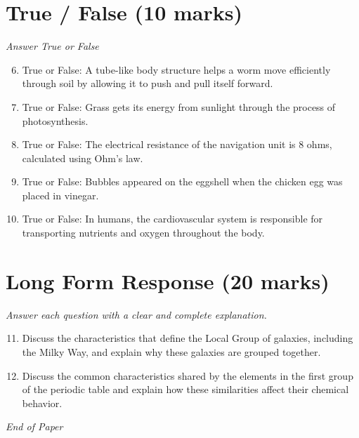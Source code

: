 \documentclass[12pt]{article}
\begin{document}
\section*{True / False (10 marks)}
\textit{Answer True or False}
\begin{enumerate}[label=\arabic*.]
\setcounter{enumi}{5}
\item True or False: A tube-like body structure helps a worm move efficiently through soil by allowing it to push and pull itself forward.
\item True or False: Grass gets its energy from sunlight through the process of photosynthesis.
\item True or False: The electrical resistance of the navigation unit is 8 ohms, calculated using Ohm's law.
\item True or False: Bubbles appeared on the eggshell when the chicken egg was placed in vinegar.
\item True or False: In humans, the cardiovascular system is responsible for transporting nutrients and oxygen throughout the body.
\end{enumerate}

\section*{Long Form Response (20 marks)}
\textit{Answer each question with a clear and complete explanation.}
\begin{enumerate}[label=\arabic*.]
\setcounter{enumi}{10}
\item Discuss the characteristics that define the Local Group of galaxies, including the Milky
Way, and explain why these galaxies are grouped together.
\item Discuss the common characteristics shared by the elements in the first group of the
periodic table and explain how these similarities affect their chemical behavior.
\end{enumerate}

\vfill
\noindent\textit{End of Paper}
\end{document}
